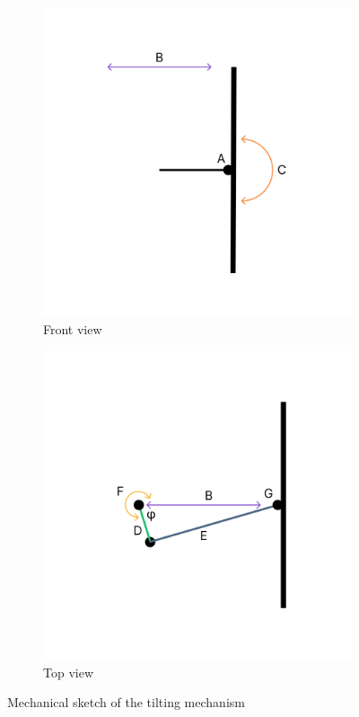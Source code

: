 \begin{figure}
  \begin{subfigure}[b]{0.49\textwidth}
    \includegraphics[width=\textwidth]{src/assets/pictures/construction/mec_front.png}
    \caption{Front view}
    \label{fig:const:tilt:mech_front}
  \end{subfigure}
  \hfill
  \begin{subfigure}[b]{0.49\textwidth}
    \includegraphics[width=\textwidth]{src/assets/pictures/construction/mec_top.png}
    \caption{Top view}
    \label{fig:const:tilt:mech_top}
  \end{subfigure}
  \caption{Mechanical sketch of the tilting mechanism}
  \label{fig:const:tilt:mech}
\end{figure}
